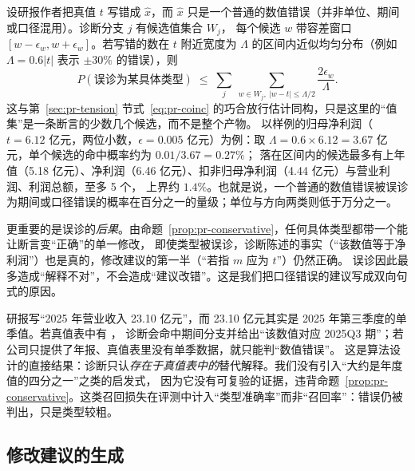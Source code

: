 设研报作者把真值 $t$ 写错成 $\hat x$，而 $\hat x$ 只是一个普通的数值错误（并非单位、期间或口径混用）。诊断分支 $j$ 有候选值集合 $W_j$，
每个候选 $w$ 带容差窗口 $[w-\epsilon_w,w+\epsilon_w]$。若写错的数在 $t$ 附近宽度为 $\Lambda$ 的区间内近似均匀分布（例如 $\Lambda=0.6|t|$ 表示 $\pm30\%$ 的错误），则
\begin{equation}
P(\text{误诊为某具体类型}) \;\le\; \sum_{j}\ \sum_{w\in W_j,\ |w-t|\le\Lambda/2} \frac{2\epsilon_w}{\Lambda}.
\label{eq:rc-misdiag}
\end{equation}
这与第~\ref{sec:pr-tension} 节式~\eqref{eq:pr-coinc} 的巧合放行估计同构，只是这里的“值集”是一条断言的少数几个候选，而不是整个产物。
以样例的归母净利润（$t=6.12$ 亿元，两位小数，$\epsilon=0.005$ 亿元）为例：取 $\Lambda=0.6\times6.12=3.67$ 亿元，单个候选的命中概率约为 $0.01/3.67=0.27\%$；
落在区间内的候选最多有上年值（5.18 亿元）、净利润（6.46 亿元）、扣非归母净利润（4.44 亿元）与营业利润、利润总额，至多 5 个，
上界约 $1.4\%$。也就是说，一个普通的数值错误被误诊为期间或口径错误的概率在百分之一的量级；单位与方向两类则低于万分之一。

更重要的是误诊的\emph{后果}。由命题~\ref{prop:pr-conservative}，任何具体类型都带一个能让断言变“正确”的单一修改，
即使类型被误诊，诊断陈述的事实（“该数值等于净利润”）也是真的，修改建议的第一半（“若指 $m$ 应为 $t$”）仍然正确。
误诊因此最多造成“解释不对”，不会造成“建议改错”。这是我们把口径错误的建议写成双向句式的原因。

\begin{failcase}
研报写“2025 年营业收入 23.10 亿元”，而 23.10 亿元其实是 2025 年第三季度的单季值。若真值表中有 ，
诊断会命中期间分支并给出“该数值对应 2025Q3 期”；若公司只提供了年报、真值表里没有单季数据，就只能判“数值错误”。
这是算法设计的直接结果：诊断只认\emph{存在于真值表中的}替代解释。我们没有引入“大约是年度值的四分之一”之类的启发式，
因为它没有可复验的证据，违背命题~\ref{prop:pr-conservative}。这类召回损失在评测中计入“类型准确率”而非“召回率”：错误仍被判出，只是类型较粗。
\end{failcase}

\subsection{修改建议的生成}
\label{sec:rc-suggest}

